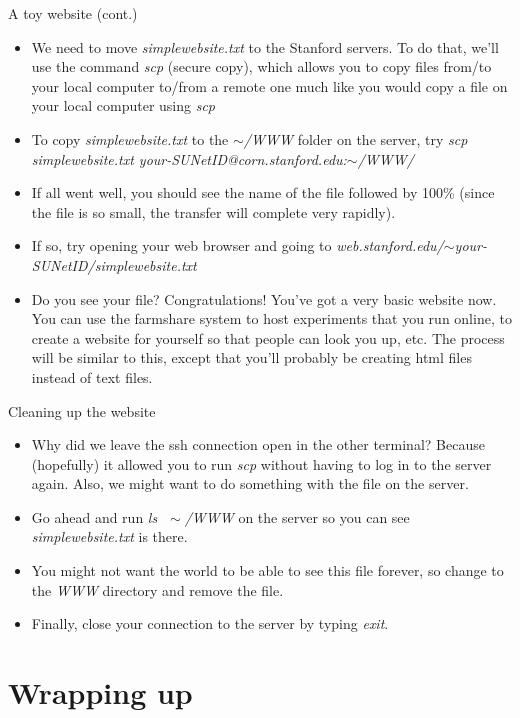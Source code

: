 \documentclass{beamer}
\begin{document}
\begin{frame}{A toy website (cont.)}
\begin{itemize}
    \item<1-> We need to move \emph{simplewebsite.txt} to the Stanford servers. To do that, we'll use the command \emph{scp} (secure copy), which allows you to copy files from/to your local computer to/from a remote one much like you would copy a file on your local computer using \emph{scp} 
    \item<2-> To copy \emph{simplewebsite.txt} to the \emph{$\sim$/WWW} folder on the server, try \emph{scp simplewebsite.txt your-SUNetID@corn.stanford.edu:$\sim$/WWW/} 
    \item<3-> If all went well, you should see the name of the file followed by 100\% (since the file is so small, the transfer will complete very rapidly). 
    \item<3-> If so, try opening your web browser and going to \emph{web.stanford.edu/$\sim$your-SUNetID/simplewebsite.txt} 
    \item<4-> Do you see your file? Congratulations! You've got a very basic website now. You can use the farmshare system to host experiments that you run online, to create a website for yourself so that people can look you up, etc. The process will be similar to this, except that you'll probably be creating html files instead of text files. 
\end{itemize}
\end{frame}

\begin{frame}{Cleaning up the website}
\begin{itemize}
    \item<1-> Why did we leave the ssh connection open in the other terminal? Because (hopefully) it allowed you to run \emph{scp} without having to log in to the server again. Also, we might want to do something with the file on the server.
    \item<2-> Go ahead and run \emph{ls $\;\sim$/WWW} on the server so you can see \emph{simplewebsite.txt} is there.
    \item<3-> You might not want the world to be able to see this file forever, so change to the \emph{WWW} directory and remove the file.
    \item<4-> Finally, close your connection to the server by typing \emph{exit}.
\end{itemize}
\end{frame}

\section{Wrapping up}
\end{document}
